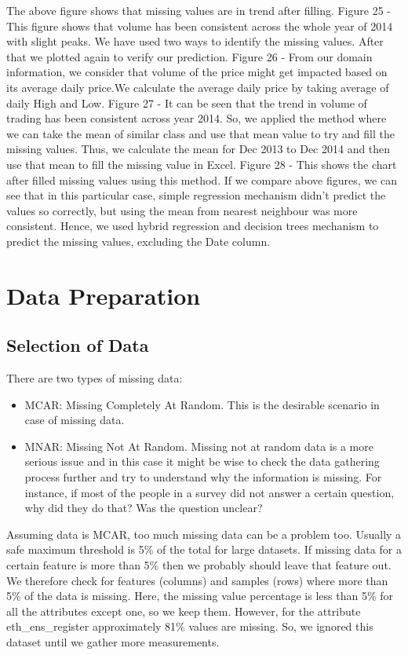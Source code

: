 \documentclass{article}
\begin{document}
\newpage
The above figure shows that missing values are in trend after filling.
\newline Figure 25 -  This figure shows that volume has been consistent across the whole year of 2014 with slight peaks. We have used two ways to identify the missing values. After that we plotted again to verify our prediction.
\newline Figure 26 - From our domain information, we consider that volume of the price might get impacted based on its average daily price.We calculate the average daily price by taking average of daily High and Low. 
\newline Figure 27 - It can be seen that the trend in volume of trading has been consistent across year 2014. So, we applied the method where we can take the mean of similar class and use that mean value to try and fill the missing values. Thus, we calculate the mean for Dec 2013 to Dec 2014 and then use that mean to fill the missing value in Excel.
\newline Figure 28 - This shows the chart after filled missing values using this method. If we compare above figures, we can see that in this particular case, simple regression mechanism didn't predict the values so correctly, but using the mean from nearest neighbour was more consistent. Hence, we used hybrid regression and decision trees mechanism to predict the missing values, excluding the Date column.

\newpage
\section{Data Preparation}

\subsection{Selection of Data}
There are two types of missing data:
\begin{itemize}
    
\item MCAR: Missing Completely At Random. This is the desirable scenario in case of missing data.
\item MNAR: Missing Not At Random. Missing not at random data is a more serious issue and in this case it might be wise to check the data gathering process further and try to understand why the information is missing. For instance, if most of the people in a survey did not answer a certain question, why did they do that? Was the question unclear?
\end{itemize}
Assuming data is MCAR, too much missing data can be a problem too. Usually a safe maximum threshold is 5\% of the total for large datasets. If missing data for a certain feature is more than 5\% then we probably should leave that feature out. We therefore check for features (columns) and samples (rows) where more than 5\% of the data is missing. Here, the missing value percentage is less than 5\% for all the attributes except one, so we keep them. However, for the attribute eth\_ens\_register approximately 81\% values are missing. So, we ignored this dataset until we gather more measurements.
\end{document}
